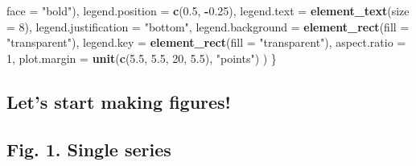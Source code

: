 \documentclass[]{article}
\newenvironment{Shaded}{\begin{snugshade}}{\end{snugshade}}
\newcommand{\KeywordTok}[1]{\textcolor[rgb]{0.13,0.29,0.53}{\textbf{#1}}}
\newcommand{\DataTypeTok}[1]{\textcolor[rgb]{0.13,0.29,0.53}{#1}}
\newcommand{\DecValTok}[1]{\textcolor[rgb]{0.00,0.00,0.81}{#1}}
\newcommand{\FloatTok}[1]{\textcolor[rgb]{0.00,0.00,0.81}{#1}}
\newcommand{\StringTok}[1]{\textcolor[rgb]{0.31,0.60,0.02}{#1}}
\newcommand{\OperatorTok}[1]{\textcolor[rgb]{0.81,0.36,0.00}{\textbf{#1}}}
\newcommand{\NormalTok}[1]{#1}
\begin{document}
\begin{Shaded}
\begin{Highlighting}[]
                                \DataTypeTok{face =} \StringTok{"bold"}\NormalTok{),}
      \DataTypeTok{legend.position =} \KeywordTok{c}\NormalTok{(}\FloatTok{0.5}\NormalTok{, }\OperatorTok{-}\FloatTok{0.25}\NormalTok{),}
      \DataTypeTok{legend.text =} \KeywordTok{element_text}\NormalTok{(}\DataTypeTok{size =} \DecValTok{8}\NormalTok{),}
      \DataTypeTok{legend.justification =} \StringTok{"bottom"}\NormalTok{, }
      \DataTypeTok{legend.background =} \KeywordTok{element_rect}\NormalTok{(}\DataTypeTok{fill =} \StringTok{"transparent"}\NormalTok{), }
      \DataTypeTok{legend.key =} \KeywordTok{element_rect}\NormalTok{(}\DataTypeTok{fill =} \StringTok{"transparent"}\NormalTok{),}
      \DataTypeTok{aspect.ratio =} \DecValTok{1}\NormalTok{,}
      \DataTypeTok{plot.margin =} \KeywordTok{unit}\NormalTok{(}\KeywordTok{c}\NormalTok{(}\FloatTok{5.5}\NormalTok{, }\FloatTok{5.5}\NormalTok{, }\DecValTok{20}\NormalTok{, }\FloatTok{5.5}\NormalTok{), }
                         \StringTok{"points"}\NormalTok{)}
\NormalTok{      )}
\NormalTok{\}}
\end{Highlighting}
\end{Shaded}

\subsection{Let's start making
figures!}\label{lets-start-making-figures}

\subsection{Fig. 1. Single series}\label{fig.-1.-single-series}
\end{document}
